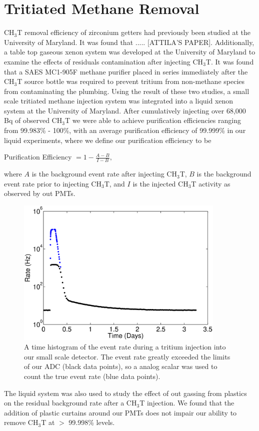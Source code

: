 \section{Tritiated Methane Removal}
\label{sec:RD}

CH$_3$T removal efficiency of zirconium getters had previously been studied at the University of Maryland.  It was found that ..... [ATTILA'S PAPER]. Additionally, a table top gaseous xenon system was developed at the University of Maryland to examine the effects of residuals contamination after injecting CH$_3$T.  It was found that a SAES MC1-905F methane purifier placed in series immediately after the CH$_3$T source bottle was required to prevent tritium from non-methane species from contaminating the plumbing. Using the result of these two studies, a small scale tritiated methane injection system was integrated into a liquid xenon system at the University of Maryland.  After cumulatively injecting over 68,000 Bq of observed CH$_3$T we were able to achieve purification efficiencies ranging from 99.983\% - 100\%, with an average purification efficiency of 99.999\% in our liquid experiments, where we define our purification efficiency to be

\begin{center}
Purification Efficiency $= 1 - \frac{A - B}{I - B},$
\end{center}

\noindent
where $A$ is the background event rate after injecting CH$_3$T, $B$ is the background event rate prior to injecting CH$_3$T, and $I$ is the injected CH$_3$T activity as observed by out PMTs.  

\begin{figure}[h!]\centering
\includegraphics[width=100mm]{TimeHisto_Analog2.eps}
\caption{A time histogram of the event rate during a tritium injection into our small scale detector. The event rate greatly exceeded the limits of our ADC (black data points), so a analog scalar was used to count the true event rate (blue data points). }
\label{fig:Density}
\end{figure}


The liquid system was also used to study the effect of out gassing from plastics on the residual background rate after a CH$_3$T injection.  We found that the addition of plastic curtains around our PMTs does not impair our ability to remove CH$_3$T at $>$ 99.998\% levels. 